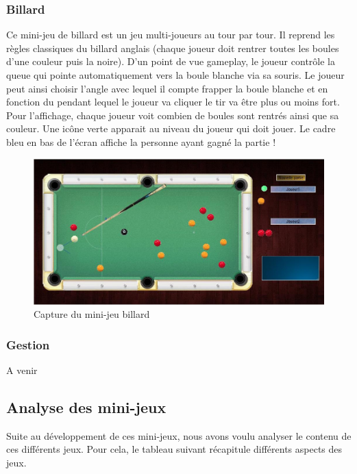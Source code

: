 \subsubsection{Billard}

Ce mini-jeu de billard est un jeu multi-joueurs au tour par tour. 
Il reprend les règles classiques du billard anglais (chaque joueur doit rentrer toutes les boules d’une couleur puis la noire). 
D’un point de vue gameplay, le joueur contrôle la queue qui pointe automatiquement vers la boule blanche via sa souris. 
Le joueur peut ainsi choisir l’angle avec lequel il compte frapper la boule blanche et en fonction du pendant lequel le joueur va cliquer le tir va être plus ou moins fort. 
Pour l’affichage, chaque joueur voit combien de boules sont rentrés ainsi que sa couleur. Une icône verte apparait au niveau du joueur qui doit jouer. 
Le cadre bleu en bas de l’écran affiche la personne ayant gagné la partie !

\begin{figure}
 \includegraphics[width=\linewidth]{img/capturejeu_billard}
 \caption{Capture du mini-jeu billard}
 \label{fig:game_billard}
\end{figure}

\subsubsection{Gestion}

A venir

\subsection{Analyse des mini-jeux}

Suite au développement de ces mini-jeux, nous avons voulu analyser le contenu de ces différents jeux.
Pour cela, le tableau suivant récapitule différents aspects des jeux.

